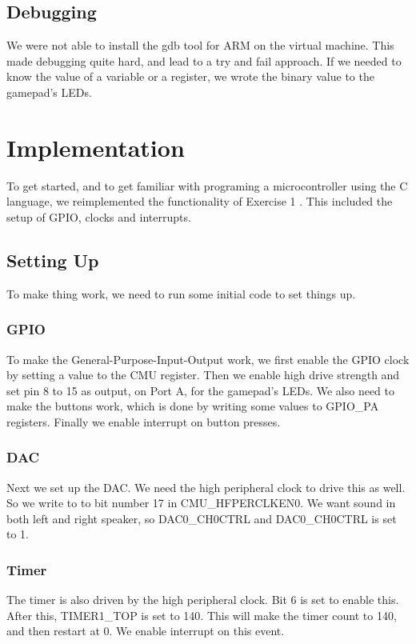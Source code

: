 \subsection{Debugging}
We were not able to install the gdb tool for ARM on the virtual machine. This made debugging quite hard, and lead to a try and fail approach. If we needed to know the value of a variable or a register, we wrote the binary value to the gamepad's LEDs.

\section{Implementation}
To get started, and to get familiar with programing a microcontroller using the C language, we reimplemented the functionality of Exercise 1 \cite{ex1}. This included the setup of GPIO, clocks and interrupts.

\subsection{Setting Up}
To make thing work, we need to run some initial code to set things up. 
\subsubsection{GPIO}
To make the General-Purpose-Input-Output work, we first enable the GPIO clock by setting a value to the CMU register.
Then we enable high drive strength and set pin 8 to 15 as output, on Port A, for the gamepad's LEDs. We also need to make the buttons work, which is done by writing some values to GPIO\_PA registers.
Finally we enable interrupt on button presses.

\subsubsection{DAC}
Next we set up the DAC. We need the high peripheral clock to drive this as well. So we write to to bit number 17 in CMU\_HFPERCLKEN0. We want sound in both left and right speaker, so DAC0\_CH0CTRL and DAC0\_CH0CTRL is set to 1.

\subsubsection{Timer}
\label{sec:timer}
The timer is also driven by the high peripheral clock. Bit 6 is set to enable this. After this, TIMER1\_TOP is set to 140. This will make the timer count to 140, and then restart at 0. We enable interrupt on this event.

